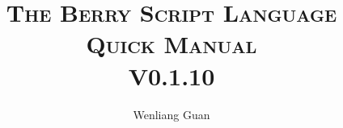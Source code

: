 \begin{titlepage}
    \title{\ebgaramond\Huge{\scshape The Berry Script Language\\Quick Manual}\\\Large{V0.1.10}}
    \author{Wenliang Guan}
    \maketitle
    \thispagestyle{empty}
\end{titlepage}
